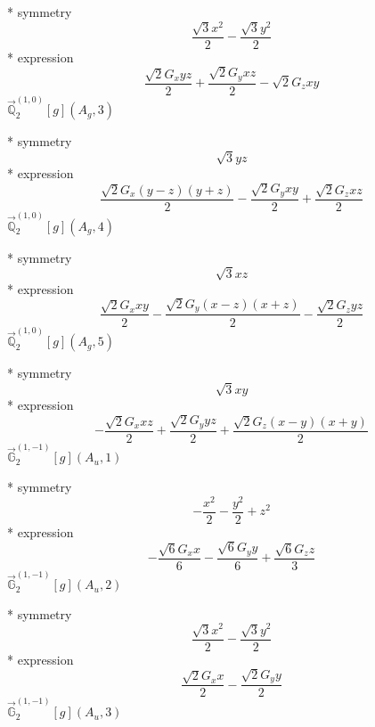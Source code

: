 \documentclass[fleqn,8pt]{jsarticle}
\begin{document}
\noindent\quad ** symmetry
\begin{dmath*}
\frac{\sqrt{3} x^{2}}{2} - \frac{\sqrt{3} y^{2}}{2}
\end{dmath*}
\noindent\quad ** expression
\begin{dmath*}
\frac{\sqrt{2} G_{x} y z}{2} + \frac{\sqrt{2} G_{y} x z}{2} - \sqrt{2} G_{z} x y
\end{dmath*}
\noindent\quad $\vec{\mathbb{Q}}_{2}^{(1,0)}[g](A_{g},3)$

\noindent\quad ** symmetry
\begin{dmath*}
\sqrt{3} y z
\end{dmath*}
\noindent\quad ** expression
\begin{dmath*}
\frac{\sqrt{2} G_{x} \left(y - z\right) \left(y + z\right)}{2} - \frac{\sqrt{2} G_{y} x y}{2} + \frac{\sqrt{2} G_{z} x z}{2}
\end{dmath*}
\noindent\quad $\vec{\mathbb{Q}}_{2}^{(1,0)}[g](A_{g},4)$

\noindent\quad ** symmetry
\begin{dmath*}
\sqrt{3} x z
\end{dmath*}
\noindent\quad ** expression
\begin{dmath*}
\frac{\sqrt{2} G_{x} x y}{2} - \frac{\sqrt{2} G_{y} \left(x - z\right) \left(x + z\right)}{2} - \frac{\sqrt{2} G_{z} y z}{2}
\end{dmath*}
\noindent\quad $\vec{\mathbb{Q}}_{2}^{(1,0)}[g](A_{g},5)$

\noindent\quad ** symmetry
\begin{dmath*}
\sqrt{3} x y
\end{dmath*}
\noindent\quad ** expression
\begin{dmath*}
- \frac{\sqrt{2} G_{x} x z}{2} + \frac{\sqrt{2} G_{y} y z}{2} + \frac{\sqrt{2} G_{z} \left(x - y\right) \left(x + y\right)}{2}
\end{dmath*}
\noindent\quad $\vec{\mathbb{G}}_{2}^{(1,-1)}[g](A_{u},1)$

\noindent\quad ** symmetry
\begin{dmath*}
- \frac{x^{2}}{2} - \frac{y^{2}}{2} + z^{2}
\end{dmath*}
\noindent\quad ** expression
\begin{dmath*}
- \frac{\sqrt{6} G_{x} x}{6} - \frac{\sqrt{6} G_{y} y}{6} + \frac{\sqrt{6} G_{z} z}{3}
\end{dmath*}
\noindent\quad $\vec{\mathbb{G}}_{2}^{(1,-1)}[g](A_{u},2)$

\noindent\quad ** symmetry
\begin{dmath*}
\frac{\sqrt{3} x^{2}}{2} - \frac{\sqrt{3} y^{2}}{2}
\end{dmath*}
\noindent\quad ** expression
\begin{dmath*}
\frac{\sqrt{2} G_{x} x}{2} - \frac{\sqrt{2} G_{y} y}{2}
\end{dmath*}
\noindent\quad $\vec{\mathbb{G}}_{2}^{(1,-1)}[g](A_{u},3)$
\end{document}
